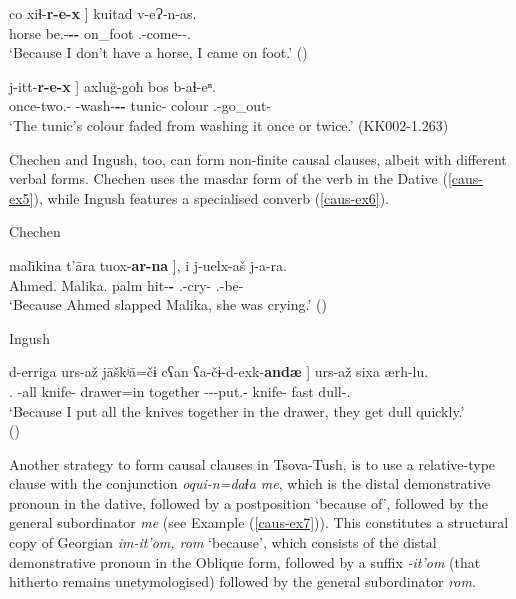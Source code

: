 	\begin{exe}
		\ex\label{caus-ex3}
		\gll {{\normalfont[} do\textsuperscript{n}}	co	{xiɬ-\textbf{r-e-x} {\normalfont]}} 	kuitad 	v-eɁ-n-as.    \\
		horse	{\Neg}	be.{\Pfv}-\textbf{{\Vn}-{\Obl}-{\Cont}}	on\_foot	{\M}.{\Sg}-come-{\Aor}-{\Fsg}.{\Erg}   \\
		\trans `Because I don’t have a horse, I came on foot.’ 
		\hfill (\cite[204]{holiskygagua})

		\ex\label{caus-ex4}
		\gll {{\normalfont[} c'q'e-ša-c'}	{j-itt-\textbf{r-e-x} {\normalfont]}}	axlu\u{g}-goħ	bos	b-aɬ-eⁿ.  \\
		once-two.{\Obl}-{\Mult}	{\J}-wash-\textbf{{\Vn}-{\Obl}-{\Cont}}	tunic-{\Adess}	colour	{\B}.{\Sg}-go\_out-{\Aor}    \\
		\trans `The tunic’s colour faded from washing it once or twice.’
		\hfill (KK002-1.263)
	\end{exe}


Chechen and Ingush, too, can form non-finite causal clauses, albeit with different verbal forms. Chechen uses the masdar form of the verb in the Dative (\ref{caus-ex5}), while Ingush features a specialised converb (\ref{caus-ex6}).


	\begin{exe}
		\ex\label{caus-ex5}
		Chechen
        
		\gll {{\normalfont[} aħamada}	mal\={\i}kina	t'\={a}ra	{tuox-\textbf{ar-na} {\normalfont]}},	i	j-uelx-aš	j-a-ra. \\
		Ahmed.{\Erg}	Malika.{\Dat}	palm	hit-\textbf{{\Vn}-{\Dat}}	{\Tsg}	{\F}.{\Sg}-cry-{\Simul}	{\F}.{\Sg}-be-{\Pst}	\\
		\trans `Because Ahmed slapped Malika, she was crying.’ 
		\hfill (\cite{good})
		
		\ex\label{caus-ex6}
		Ingush
        
		\gll {{\normalfont[} \={a}z}	d-erriga	urs-až	j\={a}škʲ\={a}=čɨ	cʕan	{ʕa-čɨ-d-exk-\textbf{andæ} {\normalfont]}}	urs-až	sixa	ærh-lu. \\
		{\Fsg}.{\Erg}	{\D}-all	knife-{\Pl}	drawer=in	together {\Pv}-{\Pv}-{\D}-put.{\Pl}-\textbf{{\Caus}}	knife-{\Pl}	fast	dull-{\Intr}.{\Prs}	\\
		\trans `Because I put all the knives together in the drawer, they get dull quickly.’  \\
		\hfill (\cite[608]{nichols11})
	\end{exe}


Another strategy to form causal clauses in Tsova-Tush, is to use a relative-type clause with the conjunction \textit{oqui-n=da{ɬ}a me}, which is the distal demonstrative pronoun in the dative, followed by a postposition ‘because of’, followed by the general subordinator \textit{me} (see Example (\ref{caus-ex7})). This constitutes a structural copy of Georgian \textit{im-it'om, rom} ‘because’, which consists of the distal demonstrative pronoun in the Oblique form, followed by a suffix \textit{-it'om} (that hitherto remains unetymologised) followed by the general subordinator \textit{rom}.



